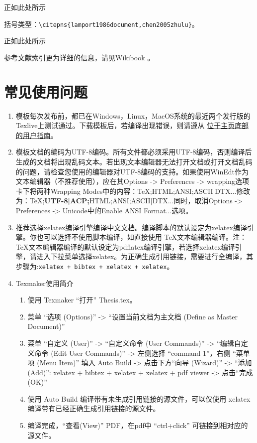 正如此处所示

括号类型：\verb|\citepns{lamport1986document,chen2005zhulu}|。

正如此处所示

参考文献索引更为详细的信息，请见Wikibook\citep{wikibook2014latex} \nocite{*}。

\section{常见使用问题}\label{sec:qa}

\begin{enumerate}
    \item 模板每次发布前，都已在Windows，Linux，MacOS系统的最近两个发行版的Texlive上测试通过。下载模板后，若编译出现错误，则请遵从 \href{https://github.com/mohuangrui/ucasthesis}{位于主页底部的用户指南}。

    \item 模板文档的编码为UTF-8编码。所有文件都必须采用UTF-8编码，否则编译后生成的文档将出现乱码文本。若出现文本编辑器无法打开文档或打开文档乱码的问题，请检查您使用的编辑器对UTF-8编码的支持。如果使用WinEdt作为文本编辑器（不推荐使用），应在其Options -> Preferences -> wrapping选项卡下将两种Wrapping Modes中的内容：TeX;HTML;ANSI;ASCII|DTX...修改为：TeX;\textbf{UTF-8|ACP;}HTML;ANSI;ASCII|DTX...同时，取消Options -> Preferences -> Unicode中的Enable ANSI Format...选项。

    \item 推荐选择xelatex编译引擎编译中文文档。编译脚本的默认设定为xelatex编译引擎。你也可以选择不使用脚本编译，如直接使用 \TeX{}文本编辑器编译。注：\TeX{}文本编辑器编译的默认设定为pdflatex编译引擎，若选择xelatex编译引擎，请进入下拉菜单选择xelatex。为正确生成引用链接，需要进行全编译，其步骤为:\verb|xelatex + bibtex + xelatex + xelatex|。
    \item Texmaker使用简介
        \begin{enumerate}
            \footnotesize
            \item 使用 Texmaker “打开” Thesis.tex。
            \item 菜单 “选项 (Options)” -> “设置当前文档为主文档 (Define as Master Document)”
            \item 菜单 “自定义 (User)” -> “自定义命令 (User Commands)” -> “编辑自定义命令 (Edit User Commands)” -> 左侧选择 “command 1”，右侧 “菜单项 (Menu Item)” 填入 Auto Build -> 点击下方“向导 (Wizard)” -> “添加 (Add)”: xelatex + bibtex + xelatex + xelatex + pdf viewer -> 点击“完成 (OK)”
            \item 使用 Auto Build 编译带有未生成引用链接的源文件，可以仅使用 xelatex 编译带有已经正确生成引用链接的源文件。
            \item 编译完成，“查看(View)” PDF，在pdf中 “ctrl+click” 可链接到相对应的源文件。
        \end{enumerate}
    

\end{enumerate}
